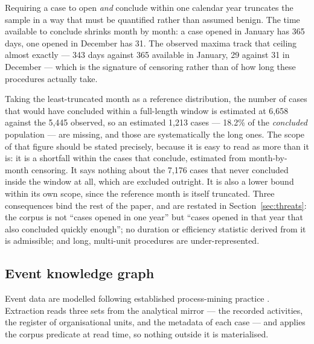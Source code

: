 Requiring a case to open \emph{and} conclude within one calendar year truncates the sample in a
way that must be quantified rather than assumed benign. The time available to conclude shrinks
month by month: a case opened in January has 365 days, one opened in December has 31. The
observed maxima track that ceiling almost exactly --- 343 days against 365 available in January,
29 against 31 in December --- which is the signature of censoring rather than of how long these
procedures actually take.



Taking the least-truncated month as a reference distribution, the number of cases that would
have concluded within a full-length window is estimated at 6{,}658 against the 5{,}445 observed,
so an estimated 1{,}213 cases --- 18.2\% of the \emph{concluded} population --- are missing, and
those are systematically the long ones. The scope of that figure should be stated precisely,
because it is easy to read as more than it is: it is a shortfall within the cases that conclude,
estimated from month-by-month censoring. It says nothing about the 7{,}176 cases that never
concluded inside the window at all, which are excluded outright. It is also a lower bound within
its own scope, since the reference month is itself truncated. Three consequences bind the rest of
the paper, and are restated in Section~\ref{sec:threats}: the corpus is not ``cases opened in one
year'' but ``cases opened in that year that also concluded quickly enough''; no duration or
efficiency statistic derived from it is admissible; and long, multi-unit procedures are
under-represented.

\subsection{Event knowledge graph}\label{sec:ekg}

Event data are modelled following established process-mining practice
\citep{vanderaalst2016processmining}. Extraction reads three sets from the analytical mirror ---
the recorded activities, the register of organisational units, and the metadata of each case ---
and applies the corpus predicate at read time, so nothing outside it is materialised.

